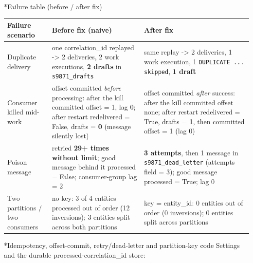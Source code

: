 \documentclass[11pt]{article}
\makeatletter
\renewcommand\subsection{\@startsection{subsection}{2}{\z@}{-2.2ex \@plus -1ex \@minus -.2ex}{0.8ex \@plus.2ex}{\normalfont\fontsize{12}{14.5}\selectfont\bfseries}}
\makeatother
\begin{document}
\subsection*{Failure table (before / after fix)}
\begin{center}
{\footnotesize\setlength{\tabcolsep}{3pt}
\begin{tabular}{p{1.05in}p{2.7in}p{2.65in}}
\toprule
\textbf{Failure scenario} & \textbf{Before fix (naive)} & \textbf{After fix} \\
\midrule
Duplicate delivery & one correlation\_id replayed -> 2 deliveries, 2 work executions, \textbf{2 drafts} in \texttt{s9871\_\allowbreak{}drafts} & same replay -> 2 deliveries, 1 work execution, 1 \texttt{DUPLICATE ... skipped}, \textbf{1 draft} \\
Consumer killed mid-work & offset committed \emph{before} processing: after the kill committed offset = 1, lag 0; after restart redelivered = False, drafts = \textbf{0} (message silently lost) & offset committed \emph{after} success: after the kill committed offset = none; after restart redelivered = True, drafts = \textbf{1}, then committed offset = 1 (lag 0) \\
Poison message & retried \textbf{29+ times without limit}; good message behind it processed = False; consumer-group lag = 2 & \textbf{3 attempts}, then 1 message in \texttt{s9871\_\allowbreak{}dead\_\allowbreak{}letter} (attempts field = 3); good message processed = True; lag 0 \\
Two partitions / two consumers & no key: 3 of 4 entities processed out of order (12 inversions); 3 entities split across both partitions & key = entity\_id: 0 entities out of order (0 inversions); 0 entities split across partitions \\
\bottomrule
\end{tabular}}
\end{center}
\subsection*{Idempotency, offset-commit, retry/dead-letter and partition-key code}
Settings and the durable processed-correlation\_id store:
\end{document}
